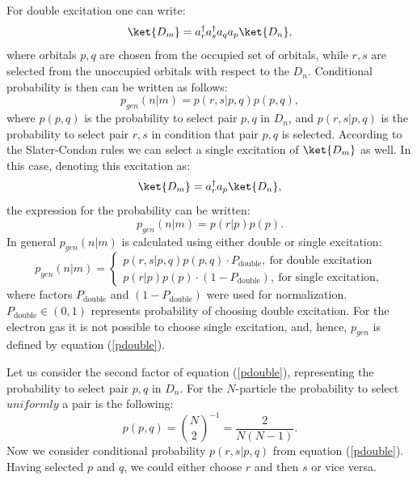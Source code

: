 \documentclass[twoside,english]{uiofysmaster}
\begin{document}
For double excitation one can write:
\begin{equation}
\ket{D_{m}}=a^\dagger_r a^\dagger_s a_q a_p \ket{D_n}, 
\end{equation}
where orbitals $p,q$ are chosen from the occupied set of orbitals, while $r,s$ are selected from the unoccupied orbitals with respect to the $D_n$. Conditional probability is then can be written as follows:
\begin{equation}\label{pdouble}
p_{gen}(n|m) = p(r,s|p,q)p(p,q),
\end{equation}
where $p(p,q)$ is the probability to select pair $p,q$ in $D_n$, and $p(r,s|p,q)$ is the probability to select pair $r,s$ in condition that pair $p,q$ is selected.
According to the Slater-Condon rules we can select a single excitation of $\ket{D_m}$ as well. In this case, denoting this excitation as:
\begin{equation*}
\ket{D_{m}}=a^\dagger_r  a_p \ket{D_n},
\end{equation*}
the expression for the probability can be written:
\begin{equation}
p_{gen}(n|m) = p(r|p)p(p).
\end{equation}
In general $p_{gen}(n|m)$ is calculated using either double or single excitation:
\[
p_{gen}(n|m)=\left\{
\begin{array}{ll}
p(r,s|p,q)p(p,q) \cdot P_{\text{double}}, \ \text{for double excitation}\\
p(r|p)p(p) \cdot (1-P_{\text{double}}), \ \text{for single excitation},
\end{array}
\right.
\]
where factors $P_{\text{double}}$ and $(1-P_{\text{double}})$ were used for normalization. $P_{\text{double}} \in (0,1)$ represents probability of choosing double excitation. For the electron gas it is not possible to choose single excitation, and, hence, $p_{gen}$ is defined by equation (\ref{pdouble}).

Let us consider the second factor of equation (\ref{pdouble}), representing the probability to select pair $p,q$ in $D_n$. For the $N$-particle the probability to select $uniformly$ a pair is the following:
\begin{equation}
p(p,q) = {\binom{N}{2}}^{-1} = \frac{2}{N(N-1)}.
\end{equation}
Now we consider conditional probability $p(r,s|p,q)$ from equation (\ref{pdouble}). Having selected $p$ and $q$, we could either choose $r$ and then $s$ or vice versa.
\end{document}
